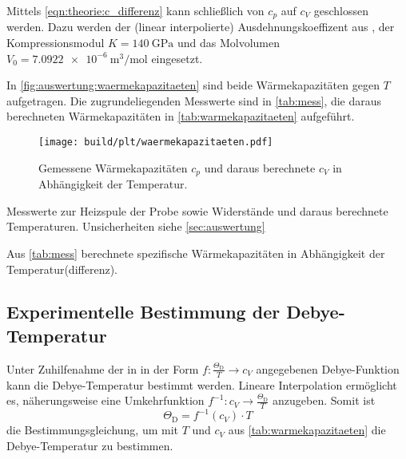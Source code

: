 Mittels \autoref{eqn:theorie:c_differenz} kann schließlich von $c_p$ auf $c_V$ geschlossen werden.
Dazu werden
der (linear interpolierte) Ausdehnungskoeffizent aus \cite[Tabelle 2]{versuchsanleitung},
der Kompressionsmodul $K = \SI{140}{\giga\pascal}$ \cite{periodictable} und
das Molvolumen $V_0 = \SI{7.0922e-6}{\cubic\meter\per\mol}$ \cite{periodictable} eingesetzt.

In \autoref{fig:auswertung:waermekapazitaeten} sind beide Wärmekapazitäten gegen $T$ aufgetragen.
Die zugrundeliegenden Messwerte sind in \autoref{tab:mess},
die daraus berechneten Wärmekapazitäten in \autoref{tab:warmekapazitaeten} aufgeführt.

\begin{figure}[H]
    \centering
    \texttt{[image: build/plt/waermekapazitaeten.pdf]}
    \caption{Gemessene Wärmekapazitäten $c_p$ und daraus berechnete $c_V$ in Abhängigkeit der Temperatur.}
    \label{fig:auswertung:waermekapazitaeten}
\end{figure}

\begin{table}
    \centering
    \caption{Messwerte zur Heizspule der Probe sowie Widerstände und daraus berechnete Temperaturen. Unsicherheiten siehe \autoref{sec:auswertung}}
    \label{tab:mess}
\end{table}

\begin{table}
    \centering
    \caption{Aus \autoref{tab:mess} berechnete spezifische Wärmekapazitäten in Abhängigkeit der Temperatur(differenz).}
    \label{tab:warmekapazitaeten}
\end{table}


\subsection{Experimentelle Bestimmung der Debye-Temperatur}
\label{sec:auswertung:debye_exp}
Unter Zuhilfenahme der in \cite[Tabelle 1]{versuchsanleitung}
in der Form $f: \frac{\Theta_\text{D}}{T} \longrightarrow c_V$
angegebenen Debye-Funktion
kann die Debye-Temperatur bestimmt werden.
Lineare Interpolation ermöglicht es, näherungsweise eine Umkehrfunktion
$f^{-1}: c_V \longrightarrow \frac{\Theta_\text{D}}{T}$
anzugeben.
Somit ist
\[
    \Theta_\text{D} = f^{-1}(c_V) · T
\]
die Bestimmungsgleichung, um mit $T$ und $c_V$ aus \autoref{tab:warmekapazitaeten} die Debye-Temperatur zu bestimmen.

